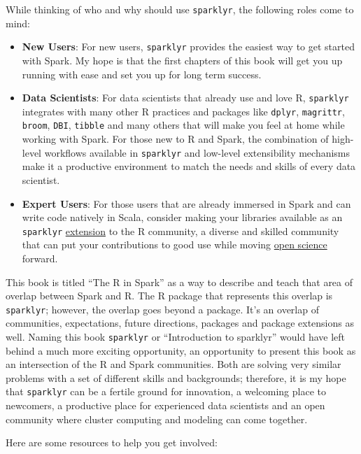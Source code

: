 \documentclass[]{book}
\providecommand{\tightlist}{%
  \setlength{\itemsep}{0pt}\setlength{\parskip}{0pt}}
\theoremstyle{definition}
\theoremstyle{definition}
\theoremstyle{definition}
\theoremstyle{remark}
\begin{document}
While thinking of who and why should use \texttt{sparklyr}, the
following roles come to mind:

\begin{itemize}
\tightlist
\item
  \textbf{New Users}: For new users, \texttt{sparklyr} provides the
  easiest way to get started with Spark. My hope is that the first
  chapters of this book will get you up running with ease and set you up
  for long term success.
\item
  \textbf{Data Scientists}: For data scientists that already use and
  love R, \texttt{sparklyr} integrates with many other R practices and
  packages like \texttt{dplyr}, \texttt{magrittr}, \texttt{broom},
  \texttt{DBI}, \texttt{tibble} and many others that will make you feel
  at home while working with Spark. For those new to R and Spark, the
  combination of high-level workflows available in \texttt{sparklyr} and
  low-level extensibility mechanisms make it a productive environment to
  match the needs and skills of every data scientist.
\item
  \textbf{Expert Users}: For those users that are already immersed in
  Spark and can write code natively in Scala, consider making your
  libraries available as an \texttt{sparklyr}
  \protect\hyperlink{writting-extensions}{extension} to the R community,
  a diverse and skilled community that can put your contributions to
  good use while moving
  \href{https://en.wikipedia.org/wiki/Open_science}{open science}
  forward.
\end{itemize}

This book is titled ``The R in Spark'' as a way to describe and teach
that area of overlap between Spark and R. The R package that represents
this overlap is \texttt{sparklyr}; however, the overlap goes beyond a
package. It's an overlap of communities, expectations, future
directions, packages and package extensions as well. Naming this book
\texttt{sparklyr} or ``Introduction to sparklyr'' would have left behind
a much more exciting opportunity, an opportunity to present this book as
an intersection of the R and Spark communities. Both are solving very
similar problems with a set of different skills and backgrounds;
therefore, it is my hope that \texttt{sparklyr} can be a fertile ground
for innovation, a welcoming place to newcomers, a productive place for
experienced data scientists and an open community where cluster
computing and modeling can come together.

Here are some resources to help you get involved:
\end{document}
